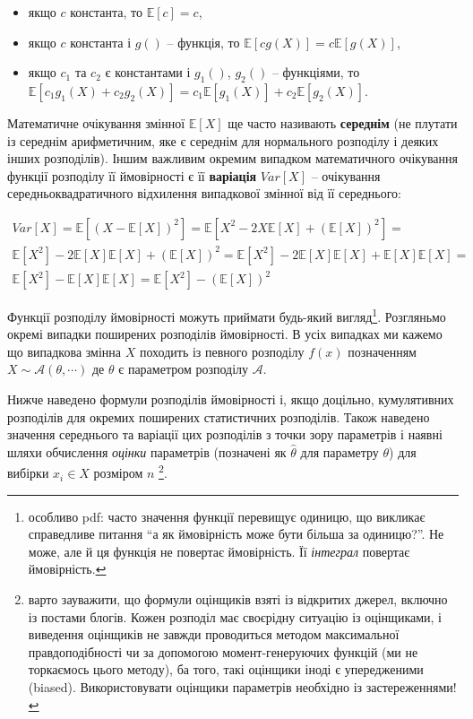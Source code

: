 \documentclass[
  11pt,
]{book}
\begin{document}
\begin{itemize}
\item
  якщо \(c\) константа, то \(\mathbb{E}[c] = c\),
\item
  якщо \(c\) константа і \(g()\) -- функція, то
  \(\mathbb{E}[c g(X)] = c \mathbb{E} [g(X)]\),
\item
  якщо \(c_1\) та \(c_2\) є константами і \(g_1()\), \(g_2()\) --
  функціями, то
  \(\mathbb{E}[c_1 g_1 (X) + c_2 g_2(X)] = c_1 \mathbb{E}[g_1(X)] + c_2 \mathbb{E}[g_2(X)]\).
\end{itemize}

Математичне очікування змінної \(\mathbb{E}[X]\) ще часто називають
\textbf{середнім} (не плутати із середнім арифметичним, яке є середнім
для нормального розподілу і деяких інших розподілів). Іншим важливим
окремим випадком математичного очікування функції розподілу її
ймовірності є її \textbf{варіація} \(Var[X]\) -- очікування
середньоквадратичного відхилення випадкової змінної від її середнього:

\[
\begin{aligned}
  Var[X] = \mathbb{E} \left[ (X - \mathbb{E}[X])^2 \right] = \mathbb{E} \left[ X^2 - 2X \mathbb{E} [X] + (\mathbb{E} [X])^2 \right] = \\
  \mathbb{E} [X^2] - 2 \mathbb{E}[X] \mathbb{E}[X] + (\mathbb{E}[X])^2 = \mathbb{E} [X^2] - 2 \mathbb{E}[X] \mathbb{E}[X] + \mathbb{E}[X] \mathbb{E}[X] = \\
  \mathbb{E}[X^2] - \mathbb{E}[X] \mathbb{E}[X] = \mathbb{E}[X^2] - (\mathbb{E}[X])^2
\end{aligned}
\]

Функції розподілу ймовірності можуть приймати будь-який
вигляд\footnote{особливо pdf: часто значення функції перевищує одиницю,
  що викликає справедливе питання ``а як ймовірність може бути більша за
  одиницю?''. Не може, але й ця функція не повертає ймовірність. Її
  \emph{інтеграл} повертає ймовірність.}. Розгляньмо окремі випадки
поширених розподілів ймовірності. В усіх випадках ми кажемо що випадкова
змінна \(X\) походить із певного розподілу \(f(x)\) позначенням
\(X \sim \mathcal{A}(\theta, \cdots)\) де \(\theta\) є параметром
розподілу \(\mathcal{A}\).

Нижче наведено формули розподілів ймовірності і, якщо доцільно,
кумулятивних розподілів для окремих поширених статистичних розподілів.
Також наведено значення середнього та варіації цих розподілів з точки
зору параметрів і наявні шляхи обчислення \emph{оцінки} параметрів
(позначені як \(\hat{\theta}\) для параметру \(\theta\)) для вибірки
\(x_i \in X\) розміром \(n\) \footnote{варто зауважити, що формули
  оцінщиків взяті із відкритих джерел, включно із постами блогів. Кожен
  розподіл має своєрідну ситуацію із оцінщиками, і виведення оцінщиків
  не завжди проводиться методом максимальної правдоподібності чи за
  допомогою момент-генеруючих функцій (ми не торкаємось цього методу),
  ба того, такі оцінщики іноді є упередженими (biased). Використовувати
  оцінщики параметрів необхідно із застереженнями!}.
\end{document}

